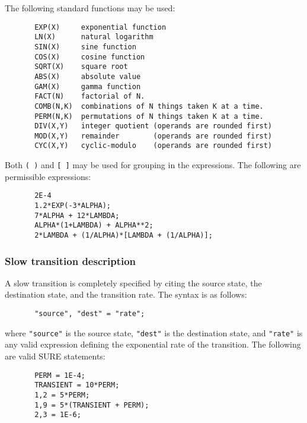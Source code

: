 The following standard functions may be used:
\begin{verbatim}
       EXP(X)     exponential function
       LN(X)      natural logarithm
       SIN(X)     sine function
       COS(X)     cosine function
       SQRT(X)    square root
       ABS(X)     absolute value 
       GAM(X)     gamma function
       FACT(N)    factorial of N.
       COMB(N,K)  combinations of N things taken K at a time.
       PERM(N,K)  permutations of N things taken K at a time.
       DIV(X,Y)   integer quotient (operands are rounded first)
       MOD(X,Y)   remainder        (operands are rounded first)
       CYC(X,Y)   cyclic-modulo    (operands are rounded first)
\end{verbatim}
Both \verb|( )| and \verb|[ ]| may be used for grouping in the expressions.
The following are permissible expressions:
\begin{verbatim}
       2E-4
       1.2*EXP(-3*ALPHA);
       7*ALPHA + 12*LAMBDA;
       ALPHA*(1+LAMBDA) + ALPHA**2;
       2*LAMBDA + (1/ALPHA)*[LAMBDA + (1/ALPHA)];
\end{verbatim}

\subsubsection{Slow transition description} A slow transition is completely 
specified by citing the source state, the destination state, and the
transition rate.  The syntax is as follows:
\begin{verbatim}
       "source", "dest" = "rate";
\end{verbatim}
where \verb|"source"| is the source state, \verb|"dest"| is the destination
state, and \verb|"rate"| is any valid expression defining the exponential
rate of the transition.  The following are valid SURE statements:
\begin{verbatim}
       PERM = 1E-4;
       TRANSIENT = 10*PERM;
       1,2 = 5*PERM;
       1,9 = 5*(TRANSIENT + PERM);
       2,3 = 1E-6;
\end{verbatim}


